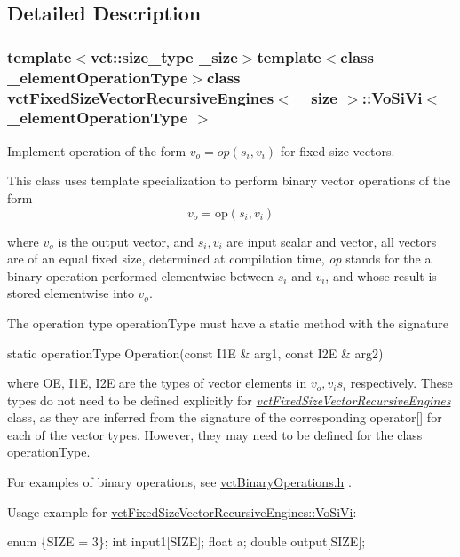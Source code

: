 \subsection{Detailed Description}
\subsubsection*{template$<$vct\-::size\-\_\-type \-\_\-size$>$template$<$class \-\_\-element\-Operation\-Type$>$class vct\-Fixed\-Size\-Vector\-Recursive\-Engines$<$ \-\_\-size $>$\-::\-Vo\-Si\-Vi$<$ \-\_\-element\-Operation\-Type $>$}

Implement operation of the form $v_o = op(s_i, v_i)$ for fixed size vectors. 

This class uses template specialization to perform binary vector operations of the form \[ v_o = \mathrm{op}(s_i, v_i) \]

where $v_o$ is the output vector, and $s_i, v_i$ are input scalar and vector, all vectors are of an equal fixed size, determined at compilation time, {\itshape op} stands for the a binary operation performed elementwise between $s_i$ and $v_i$, and whose result is stored elementwise into $v_o$.

The operation type operation\-Type must have a static method with the signature


\begin{DoxyPre}
static operationType Operation(const I1E & arg1, const I2E & arg2)
\end{DoxyPre}


where O\-E, I1\-E, I2\-E are the types of vector elements in $v_o, v_i s_i$ respectively. These types do not need to be defined explicitly for {\itshape \hyperlink{classvct_fixed_size_vector_recursive_engines}{vct\-Fixed\-Size\-Vector\-Recursive\-Engines}} class, as they are inferred from the signature of the corresponding operator\mbox{[}\mbox{]} for each of the vector types. However, they may need to be defined for the class operation\-Type.

For examples of binary operations, see \hyperlink{vct_binary_operations_8h}{vct\-Binary\-Operations.\-h} .

Usage example for \hyperlink{classvct_fixed_size_vector_recursive_engines_1_1_vo_si_vi}{vct\-Fixed\-Size\-Vector\-Recursive\-Engines\-::\-Vo\-Si\-Vi}\-: 
\begin{DoxyPre}
enum \{SIZE = 3\};
int input1[SIZE];
float a;
double output[SIZE];\end{DoxyPre}



